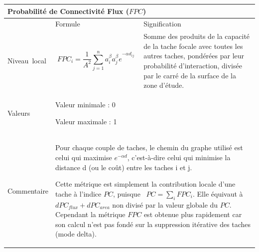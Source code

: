 \documentclass{article}
\begin{document}
\begin{table}[H]
\begin{tabular}{|m{3.24cm}|m{4.4810004cm}m{7.924cm}|}

\hline
\multicolumn{3}{|m{16.044998cm}|}{Probabilité de Connectivité Flux ($FPC$)}\\\hline
 &
\multicolumn{1}{m{4.4810004cm}|}{Formule} &
Signification\\\hline
Niveau~local &
\multicolumn{1}{m{4.4810004cm}|}{\begin{equation*}
{\mathit{FPC}}_{i}=\frac{1}{{A}^{2}}\sum _{j=1}^{n}{{{a}_{i}^{\beta }{a}_{j}^{\beta }e}^{-\alpha {d}_{\mathit{ij}}}}
\end{equation*}
} &
Somme des produits de la capacité de la tache focale avec toutes les autres taches, pondérées par leur probabilité d’interaction, divisée par le carré de la surface de la zone d’étude.

\\\hline
Valeurs &
\multicolumn{2}{m{12.6050005cm}|}{Valeur minimale : 0

Valeur maximale : 1
}\\\hline
Commentaire &
\multicolumn{2}{m{12.6050005cm}|}{Pour chaque couple de taches, le chemin du graphe utilisé est celui qui maximise  ${e}^{-\mathit{\alpha d}}$, c’est-à-dire celui qui minimise la distance d (ou le coût) entre les taches i et j.

Cette métrique est simplement la contribution locale d’une tache à l’indice $PC$, puisque~ $\mathit{PC}=\sum _{i}{{\mathit{FPC}}_{i}}$. Elle équivaut à  ${dPC}_{flux}+{dPC}_{area}$ non divisé par la valeur globale du $PC$. Cependant la métrique $FPC$ est obtenue plus rapidement car son calcul n’est pas fondé sur la suppression itérative des taches (mode delta).

}\\\hline
\end{tabular}
\end{table}
\end{document}
